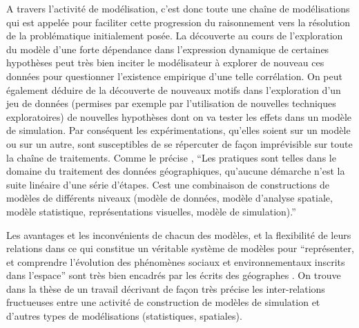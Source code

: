 A travers l'activité de modélisation, c'est donc toute une chaîne de modélisations qui est appelée pour faciliter cette progression du raisonnement vers la résolution de la problématique initialement posée. La découverte au cours de l'exploration du modèle d'une forte dépendance dans l'expression dynamique de certaines hypothèses peut très bien inciter le modélisateur à explorer de nouveau ces données pour questionner l'existence empirique d'une telle corrélation. On peut également déduire de la découverte de nouveaux motifs dans l'exploration d'un jeu de données (permises par exemple par l'utilisation de nouvelles techniques exploratoires) de nouvelles hypothèses dont on va tester les effets dans un modèle de simulation. Par conséquent les expérimentations, qu'elles soient sur un modèle ou sur un autre, sont susceptibles de se répercuter de façon imprévisible sur toute la chaîne de traitements. Comme le précise \textcite[63]{Mathian2014}, \enquote{Les pratiques sont telles dans le domaine du traitement des données géographiques, qu'aucune démarche n'est la suite linéaire d'une série d'étapes. Cest une combinaison de constructions de modèles de différents niveaux (modèle de données, modèle d'analyse spatiale, modèle statistique, représentations visuelles, modèle de simulation).}

Les avantages et les inconvénients de chacun des modèles, et la flexibilité de leurs relations dans ce qui constitue un véritable système de modèles pour \enquote{représenter, et comprendre l'évolution des phénomènes sociaux et environnementaux inscrits dans l'espace} sont très bien encadrés par les écrits des géographes \textcites{Sanders2000, Mathian2014}. On trouve dans la thèse de \textcite{Cottineau2014a, Cottineau2014b} un travail décrivant de façon très précise les inter-relations fructueuses entre une activité de construction de modèles de simulation et d'autres types de modélisations (statistiques, spatiales).



